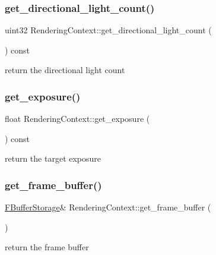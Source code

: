 \subsubsection{\texorpdfstring{get\+\_\+directional\+\_\+light\+\_\+count()}{get\_directional\_light\_count()}}
{\footnotesize\ttfamily uint32 Rendering\+Context\+::get\+\_\+directional\+\_\+light\+\_\+count (\begin{DoxyParamCaption}{ }\end{DoxyParamCaption}) const}

return the directional light count \mbox{\label{struct_rendering_context_a346cbf7828c35140795353caaefc1c22}} 
\subsubsection{\texorpdfstring{get\+\_\+exposure()}{get\_exposure()}}
{\footnotesize\ttfamily float Rendering\+Context\+::get\+\_\+exposure (\begin{DoxyParamCaption}{ }\end{DoxyParamCaption}) const}

return the target exposure \mbox{\label{struct_rendering_context_a916dc69fc808c2a2c302513bd34d9601}} 
\subsubsection{\texorpdfstring{get\+\_\+frame\+\_\+buffer()}{get\_frame\_buffer()}}
{\footnotesize\ttfamily \hyperlink{struct_f_buffer_storage}{F\+Buffer\+Storage}\& Rendering\+Context\+::get\+\_\+frame\+\_\+buffer (\begin{DoxyParamCaption}{ }\end{DoxyParamCaption})}

return the frame buffer \mbox{\label{struct_rendering_context_adc110ed38e84d66c71b1c76f650232e9}} 
